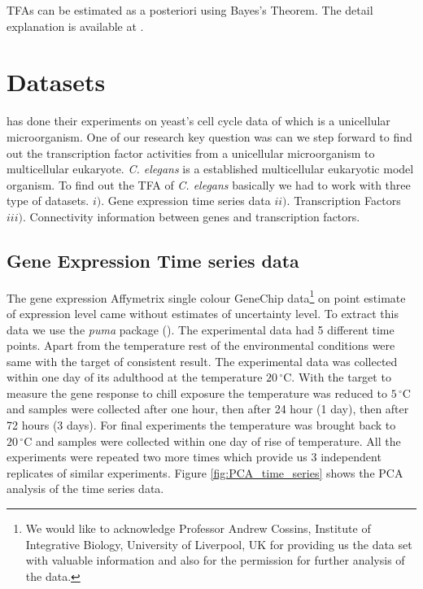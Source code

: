 TFAs can be estimated as a posteriori using Bayes’s Theorem. The detail explanation is available at \cite{Sanguinetti:2006}.

\section{Datasets}
\cite{Sanguinetti:2006} has done their experiments on yeast's cell cycle data of \cite{Spellman:1998} which is a unicellular microorganism. One of our research key question was can we step forward to find out the transcription factor activities from a unicellular microorganism to multicellular eukaryote. \textit{C. elegans} is a established multicellular eukaryotic model organism. To find out the TFA of \textit{C. elegans} basically we had to work with three type of datasets. $i).$ Gene expression time series data $ii).$ Transcription Factors $iii).$ Connectivity information between genes and transcription factors.

\subsection{Gene Expression Time series data}
The gene expression Affymetrix single colour GeneChip data\footnote{We would like to acknowledge Professor Andrew Cossins, Institute of Integrative Biology, University of Liverpool, UK for providing us the data set with valuable information and also for the permission for further analysis of the data.} on point estimate of expression level came without estimates of uncertainty level. To extract this data we use the \textit{puma} package (\cite{puma}). The experimental data had 5 different time points. Apart from the temperature rest of the environmental conditions were same with the target of consistent result. The experimental data was collected within one day of its adulthood at the temperature $20\,^{\circ}\mathrm{C}$. With the target to measure the gene response to chill exposure the temperature was reduced to $5\,^{\circ}\mathrm{C}$ and samples were collected after one hour, then after 24 hour (1 day), then after 72 hours (3 days). For final experiments the temperature was brought back to $20\,^{\circ}\mathrm{C}$
and samples were collected within one day  of rise of temperature. All the experiments were repeated two more times which provide us 3 independent replicates of similar experiments. Figure \ref{fig:PCA_time_series} shows the PCA analysis of the time series data.


